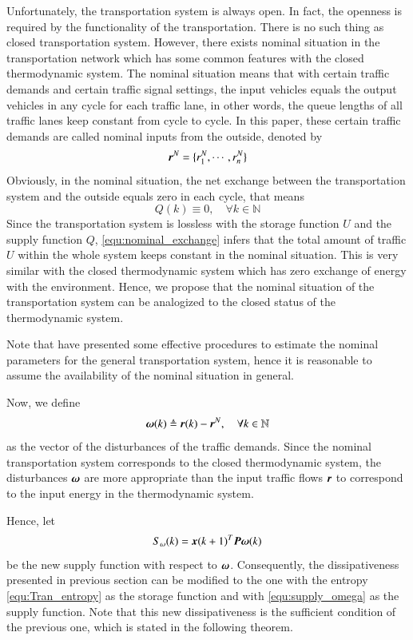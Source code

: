 \documentclass[preprint,authoryear,12pt]{elsarticle}
\renewcommand{\vec}[1]{\mbox{\boldmath$#1$}}
\newcommand{\mat}[1]{\mbox{\boldmath$#1$}}
\begin{document}
Unfortunately, the transportation system is always open. In fact, the
openness is required by the functionality of the transportation.
There is no such thing as closed transportation system. However,
there exists nominal situation \citep{diakaki_multivariable_2002} in
the transportation network which has some common features with the
closed thermodynamic system. The nominal situation means that with
certain traffic demands and certain traffic signal settings, the
input vehicles equals the output vehicles in any cycle for each
traffic lane, in other words, the queue lengths of all traffic lanes
keep constant from cycle to cycle. In this paper, these certain
traffic demands are called nominal inputs from the outside, denoted
by
$$\vec{r}^N=\{r_1^N,\cdots,r_n^N\}$$
Obviously, in the nominal situation, the net exchange between the
transportation system and the outside equals zero in each cycle, that
means
\begin{equation}\label{equ:nominal_exchange}
Q(k)\equiv 0, \quad \forall k\in\mathbb{N}
\end{equation}
Since the transportation system is lossless with the storage function
$U$ and the supply function $Q$, \eqref{equ:nominal_exchange} infers
that the total amount of traffic $U$ within the whole system keeps
constant in the nominal situation. This is very similar with the
closed thermodynamic system which has zero exchange of energy with
the environment. Hence, we propose that the nominal situation of the
transportation system can be analogized to the closed status of the
thermodynamic system.

Note that \citet{de_oliveira_multi-agent_2010} have presented some
effective procedures to estimate the nominal parameters for the
general transportation system, hence it is reasonable to assume the
availability of the nominal situation in general.

Now, we define
\begin{equation}
\vec{\omega}(k)\triangleq\vec{r}(k)-\vec{r}^N, \quad \forall
k\in\mathbb{N}
\end{equation}
as the vector of the disturbances of the traffic demands. Since the
nominal transportation system corresponds to the closed thermodynamic
system, the disturbances $\vec{\omega}$ are more appropriate than the
input traffic flows $\vec{r}$ to correspond to the input energy in
the thermodynamic system.

Hence, let
\begin{equation}\label{equ:supply_omega}
  S_\omega(k) = \vec{x}(k+1)^T \mat{P} \vec{\omega}(k)
\end{equation}
be the new supply function with respect to $\vec{\omega}$.
Consequently, the dissipativeness presented in previous section can
be modified to the one with the entropy \eqref{equ:Tran_entropy} as
the storage function and with \eqref{equ:supply_omega} as the supply
function. Note that this new dissipativeness is the sufficient
condition of the previous one, which is stated in the following
theorem.
\end{document}
